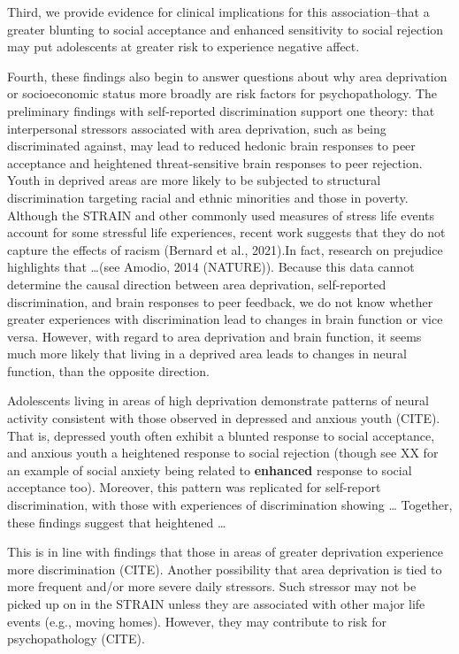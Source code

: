 \documentclass[
  man]{apa7}
\begin{document}
Third, we provide evidence for clinical implications for this association--that a greater blunting to social acceptance and enhanced sensitivity to social rejection may put adolescents at greater risk to experience negative affect.

Fourth, these findings also begin to answer questions about why area deprivation or socioeconomic status more broadly are risk factors for psychopathology. The preliminary findings with self-reported discrimination support one theory: that interpersonal stressors associated with area deprivation, such as being discriminated against, may lead to reduced hedonic brain responses to peer acceptance and heightened threat-sensitive brain responses to peer rejection. Youth in deprived areas are more likely to be subjected to structural discrimination targeting racial and ethnic minorities and those in poverty. Although the STRAIN and other commonly used measures of stress life events account for some stressful life experiences, recent work suggests that they do not capture the effects of racism (Bernard et al., 2021).In fact, research on prejudice highlights that \ldots(see Amodio, 2014 (NATURE)). Because this data cannot determine the causal direction between area deprivation, self-reported discrimination, and brain responses to peer feedback, we do not know whether greater experiences with discrimination lead to changes in brain function or vice versa. However, with regard to area deprivation and brain function, it seems much more likely that living in a deprived area leads to changes in neural function, than the opposite direction.

Adolescents living in areas of high deprivation demonstrate patterns of neural activity consistent with those observed in depressed and anxious youth (CITE). That is, depressed youth often exhibit a blunted response to social acceptance, and anxious youth a heightened response to social rejection (though see XX for an example of social anxiety being related to \textbf{enhanced} response to social acceptance too). Moreover, this pattern was replicated for self-report discrimination, with those with experiences of discrimination showing \ldots{} Together, these findings suggest that heightened \ldots{}

This is in line with findings that those in areas of greater deprivation experience more discrimination (CITE). Another possibility that area deprivation is tied to more frequent and/or more severe daily stressors. Such stressor may not be picked up on in the STRAIN unless they are associated with other major life events (e.g., moving homes). However, they may contribute to risk for psychopathology (CITE).
\end{document}
